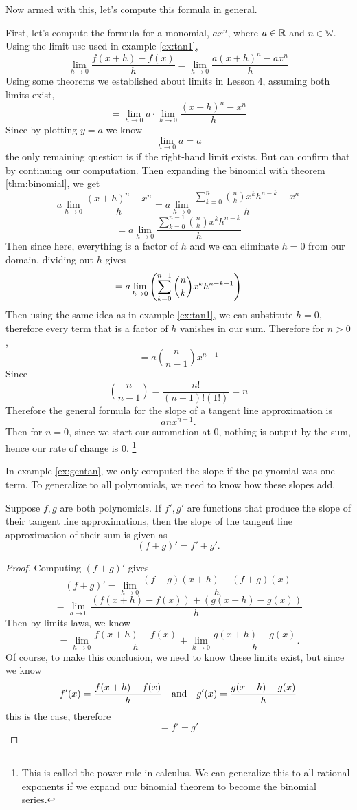 Now armed with this, let's compute this formula in general.

\begin{ex}
	First, let's compute the formula for a monomial, $ax^n$, where $a\in\mathbb{R}$ and $n\in\mathbb{W}$. Using the limit use used in example \eqref{ex:tan1},
	$$\lim_{h\to0}\frac{f(x+h)-f(x)}{h}=\lim_{h\to0}\frac{a(x+h)^n-ax^n}{h}$$
	Using some theorems we established about limits in Lesson 4, assuming both limits exist,
	$$=\lim_{h\to0}a \cdot \lim_{h\to0}\frac{(x+h)^n-x^n}{h}$$
	Since by plotting $y=a$ we know
	$$\lim_{h\to0}a=a$$
	the only remaining question is if the right-hand limit exists. But can confirm that by continuing our computation.
	Then expanding the binomial with theorem \eqref{thm:binomial}, we get
	$$a  \lim_{h\to0}\frac{(x+h)^n-x^n}{h}
	=a \lim_{h\to0}\frac{\sum^n_{k=0}\binom{n}{k}x^kh^{n-k}-x^n}{h}$$
	$$=a \lim_{h\to0}\frac{\sum^{n-1}_{k=0}\binom{n}{k}x^kh^{n-k}}{h}$$
	Then since here, everything is a factor of $h$ and we can eliminate $h=0$ from our domain, dividing out $h$ gives
	$$=a \lim_{h\to0}\left(\sum^{n-1}_{k=0}\binom{n}{k}x^kh^{n-k-1}\right)$$
	Then using the same idea as in example \eqref{ex:tan1}, we can substitute $h=0$, therefore every term that is a factor of $h$ vanishes in our sum. Therefore for $n>0$,
	$$=a \binom{n}{n-1}x^{n-1}$$
	Since
	$$\binom{n}{n-1}=\frac{n!}{{(n-1)}!(1!)}=n$$
	Therefore the general formula for the slope of a tangent line approximation is
	$$anx^{n-1}.$$
	Then for $n=0$, since we start our summation at $0$, nothing is output by the sum, hence our rate of change is 0. \footnote{This is called the power rule in calculus. We can generalize this to all rational exponents if we expand our binomial theorem to become the binomial series.}
	\label{ex:gentan}
\end{ex}

In example \eqref{ex:gentan}, we only computed the slope if the polynomial was one term. To generalize to all polynomials, we need to know how these slopes add. 

\begin{thm}
	Suppose $f,g$ are both polynomials. If $f',g'$ are functions that produce the slope of their tangent line approximations, then the slope of the tangent line approximation of their sum is given as
	$$(f+g)'=f'+g'.$$
	\label{thm:dersum}
\end{thm}
\begin{proof}
	Computing $(f+g)'$ gives
	$$(f+g)'=\lim_{h\to0}\frac{(f+g)(x+h)-(f+g)(x)}{h}$$
	$$=\lim_{h\to0}\frac{(f(x+h)-f(x))+(g(x+h)-g(x))}{h}$$
	Then by limits laws, we know
	$$=\lim_{h\to0}\frac{f(x+h)-f(x)}{h}+\lim_{h\to0}\frac{g(x+h)-g(x)}{h}.$$
	Of course, to make this conclusion, we need to know these limits exist, but since we know
	$$f'(x)=\frac{f(x+h)-f(x)}{h} \quad\text{and}\quad
		g'(x)=\frac{g(x+h)-g(x)}{h}$$
	this is the case, therefore
	$$=f'+g'$$
\end{proof}

